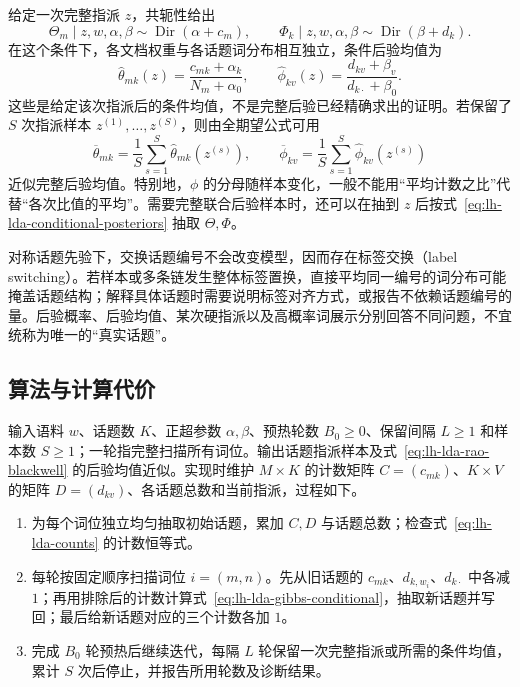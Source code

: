 给定一次完整指派 $z$，共轭性给出
\begin{equation}
\Theta_m\mid z,w,\alpha,\beta\sim\operatorname{Dir}(\alpha+c_m),\qquad
\Phi_k\mid z,w,\alpha,\beta\sim\operatorname{Dir}(\beta+d_k).
\label{eq:lh-lda-conditional-posteriors}
\end{equation}
在这个条件下，各文档权重与各话题词分布相互独立，条件后验均值为
\begin{equation}
\widehat\theta_{mk}(z)=\frac{c_{mk}+\alpha_k}{N_m+\alpha_0},\qquad
\widehat\phi_{kv}(z)=\frac{d_{kv}+\beta_v}{d_{k\cdot}+\beta_0}.
\label{eq:lh-lda-gibbs-posterior-means}
\end{equation}
这些是给定该次指派后的条件均值，不是完整后验已经精确求出的证明。若保留了 $S$ 次指派样本 $z^{(1)},\ldots,z^{(S)}$，则由全期望公式可用
\begin{equation}
\overline\theta_{mk}=\frac1S\sum_{s=1}^S\widehat\theta_{mk}(z^{(s)}),\qquad
\overline\phi_{kv}=\frac1S\sum_{s=1}^S\widehat\phi_{kv}(z^{(s)})
\label{eq:lh-lda-rao-blackwell}
\end{equation}
近似完整后验均值。特别地，$\phi$ 的分母随样本变化，一般不能用“平均计数之比”代替“各次比值的平均”。需要完整联合后验样本时，还可以在抽到 $z$ 后按式~\eqref{eq:lh-lda-conditional-posteriors} 抽取 $\Theta,\Phi$。

对称话题先验下，交换话题编号不会改变模型，因而存在标签交换（label switching）。若样本或多条链发生整体标签置换，直接平均同一编号的词分布可能掩盖话题结构；解释具体话题时需要说明标签对齐方式，或报告不依赖话题编号的量。后验概率、后验均值、某次硬指派以及高概率词展示分别回答不同问题，不宜统称为唯一的“真实话题”。

\subsection{算法与计算代价}
\label{subsec:lh-lda-gibbs-algorithm}

输入语料 $w$、话题数 $K$、正超参数 $\alpha,\beta$、预热轮数 $B_0\geq0$、保留间隔 $L\geq1$ 和样本数 $S\geq1$；一轮指完整扫描所有词位。输出话题指派样本及式~\eqref{eq:lh-lda-rao-blackwell} 的后验均值近似。实现时维护 $M\times K$ 的计数矩阵 $C=(c_{mk})$、$K\times V$ 的矩阵 $D=(d_{kv})$、各话题总数和当前指派，过程如下。
\begin{enumerate}
\item 为每个词位独立均匀抽取初始话题，累加 $C,D$ 与话题总数；检查式~\eqref{eq:lh-lda-counts} 的计数恒等式。
\item 每轮按固定顺序扫描词位 $i=(m,n)$。先从旧话题的 $c_{mk}$、$d_{k,w_i}$、$d_{k\cdot}$ 中各减 $1$；再用排除后的计数计算式~\eqref{eq:lh-lda-gibbs-conditional}，抽取新话题并写回；最后给新话题对应的三个计数各加 $1$。
\item 完成 $B_0$ 轮预热后继续迭代，每隔 $L$ 轮保留一次完整指派或所需的条件均值，累计 $S$ 次后停止，并报告所用轮数及诊断结果。
\end{enumerate}

